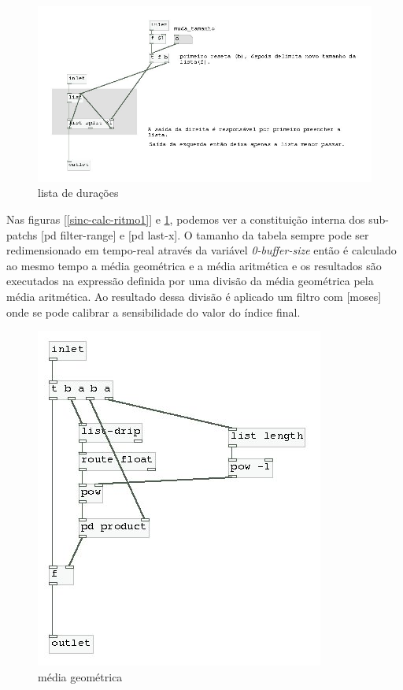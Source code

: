 \documentclass{ppgmus}
\begin{document}
\begin{figure}
\includegraphics[scale=.6]{sinc-calc-ritmo2}
\caption{lista de durações}
\label{[sinc-calc-ritmo2]}
\end{figure}

Nas figuras \ref{[sinc-calc-ritmo1]} e \ref{[sinc-calc-ritmo2]}, podemos
ver a constituição interna dos sub-patchs [pd filter-range] e [pd last-x].
O tamanho da tabela sempre pode ser redimensionado em tempo-real através
da variável \textit{0-buffer-size} então é calculado ao mesmo tempo a média geométrica
e a média aritmética e os resultados são executados na expressão definida por uma
divisão da média geométrica pela média aritmética. %
Ao resultado dessa divisão é aplicado um filtro com [moses] onde se pode calibrar
a sensibilidade do valor do índice final.




\begin{figure}
\includegraphics[scale=.6]{sinc-calc-ritmo3}
\caption{média geométrica}
\label{[sinc-calc-ritmo3]}
\end{figure}
\end{document}
